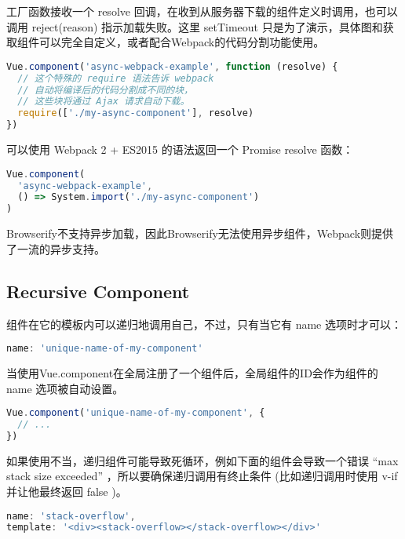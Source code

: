 工厂函数接收一个 resolve 回调，在收到从服务器下载的组件定义时调用，也可以调用 reject(reason) 指示加载失败。这里 setTimeout 只是为了演示，具体图和获取组件可以完全自定义，或者配合Webpack的代码分割功能使用。



\begin{lstlisting}[language=JavaScript]
Vue.component('async-webpack-example', function (resolve) {
  // 这个特殊的 require 语法告诉 webpack
  // 自动将编译后的代码分割成不同的块，
  // 这些块将通过 Ajax 请求自动下载。
  require(['./my-async-component'], resolve)
})
\end{lstlisting}

可以使用 Webpack 2 + ES2015 的语法返回一个 Promise resolve 函数：


\begin{lstlisting}[language=JavaScript]
Vue.component(
  'async-webpack-example',
  () => System.import('./my-async-component')
)
\end{lstlisting}

Browserify不支持异步加载，因此Browserify无法使用异步组件，Webpack则提供了一流的异步支持。

\subsection{Recursive Component}

组件在它的模板内可以递归地调用自己，不过，只有当它有 name 选项时才可以：

\begin{lstlisting}[language=JavaScript]
name: 'unique-name-of-my-component'
\end{lstlisting}

当使用Vue.component在全局注册了一个组件后，全局组件的ID会作为组件的 name 选项被自动设置。



\begin{lstlisting}[language=JavaScript]
Vue.component('unique-name-of-my-component', {
  // ...
})
\end{lstlisting}

如果使用不当，递归组件可能导致死循环，例如下面的组件会导致一个错误 “max stack size exceeded” ，所以要确保递归调用有终止条件 (比如递归调用时使用 v-if 并让他最终返回 false )。


\begin{lstlisting}[language=JavaScript]
name: 'stack-overflow',
template: '<div><stack-overflow></stack-overflow></div>'
\end{lstlisting}



